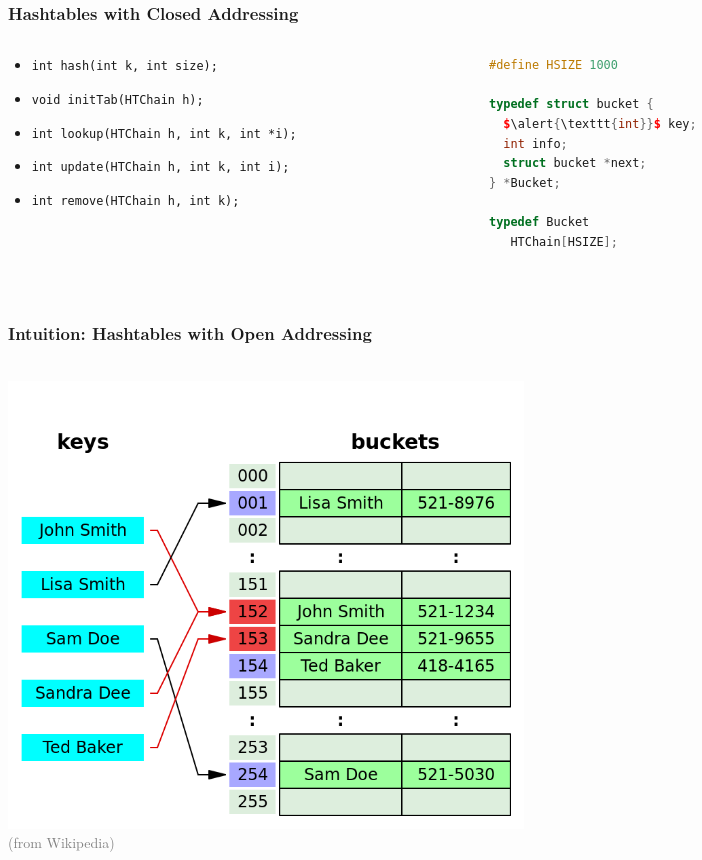 \documentclass[aspectratio=169]{beamer}
\begin{document}
\begin{frame}[fragile]\frametitle{Hashtables with Closed Addressing}
\begin{columns}
\begin{column}{.61\textwidth}
%
\begin{itemize}
  \item \texttt{int hash(\alert{\texttt{int}} k, int size);}
  \item \texttt{void initTab(HTChain h);}
  \item \texttt{int lookup(HTChain h, \alert{\texttt{int}} k, int *i);}
  \item \texttt{int update(HTChain h, \alert{\texttt{int}} k, int i);}
  \item \texttt{int remove(HTChain h, \alert{\texttt{int}} k);}
\end{itemize}
%
\end{column}
\begin{column}{.34\textwidth}
%
\begin{lstlisting}[language=C++,emph={HTChain,Bucket}]
#define HSIZE 1000

typedef struct bucket {
  $\alert{\texttt{int}}$ key;
  int info;
  struct bucket *next;
} *Bucket;

typedef Bucket
   HTChain[HSIZE];
\end{lstlisting}
%
\end{column}
\end{columns}

~\\[-10mm]
\end{frame}


\begin{frame}\frametitle{Intuition: Hashtables with Open Addressing}
  \centering
  ~\\[-12mm]
  \includegraphics[width=0.6\textwidth]{images/HT-open.png}
  \\
  {\footnotesize \textcolor{gray}{(from Wikipedia)}}
\end{frame}
\end{document}
